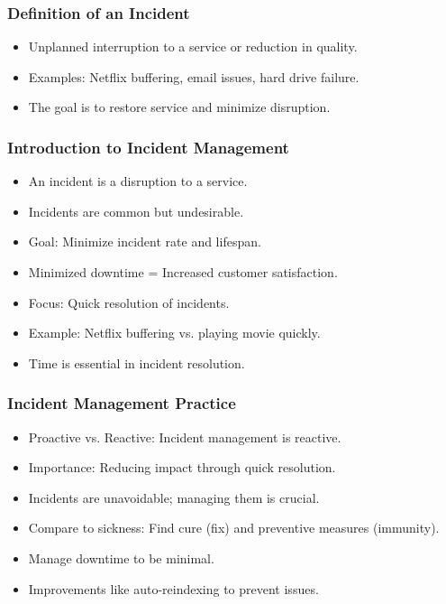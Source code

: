 \documentclass[aspectratio=169, table]{beamer}
\begin{document}
\begin{frame}
	\frametitle{Definition of an Incident}
	
	\begin{itemize}
		\item Unplanned interruption to a service or reduction in quality.
		\item Examples: Netflix buffering, email issues, hard drive failure.
		\item The goal is to restore service and minimize disruption.
	\end{itemize}
\end{frame}

\begin{frame}
	\frametitle{Introduction to Incident Management}
	\begin{itemize}
		\item An incident is a disruption to a service.
		\item Incidents are common but undesirable.
		\item Goal: Minimize incident rate and lifespan.
		\item Minimized downtime = Increased customer satisfaction.
		\item Focus: Quick resolution of incidents.
		\item Example: Netflix buffering vs. playing movie quickly.
		\item Time is essential in incident resolution.
	\end{itemize}
\end{frame}

\begin{frame}
	\frametitle{Incident Management Practice}
	\begin{itemize}
		\item Proactive vs. Reactive: Incident management is reactive.
		\item Importance: Reducing impact through quick resolution.
		\item Incidents are unavoidable; managing them is crucial.
		\item Compare to sickness: Find cure (fix) and preventive measures (immunity).
		\item Manage downtime to be minimal.
		\item Improvements like auto-reindexing to prevent issues.
	\end{itemize}
\end{frame}
\end{document}
